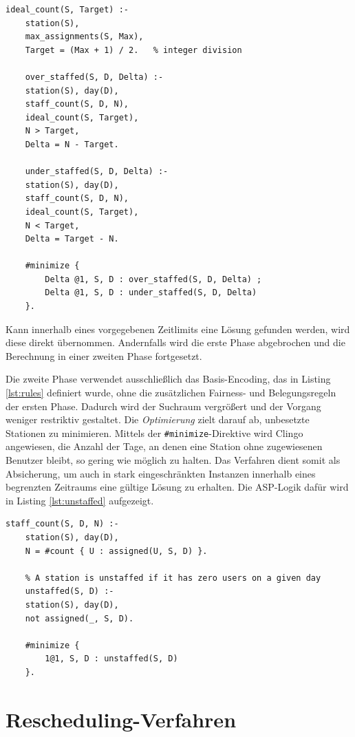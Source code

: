 \begin{lstlisting}[caption={Fairness-Regeln},label={lst:fairness}]
	ideal_count(S, Target) :-
	station(S),
	max_assignments(S, Max),
	Target = (Max + 1) / 2.   % integer division
	
	over_staffed(S, D, Delta) :-
	station(S), day(D),
	staff_count(S, D, N),
	ideal_count(S, Target),
	N > Target,
	Delta = N - Target.
	
	under_staffed(S, D, Delta) :-
	station(S), day(D),
	staff_count(S, D, N),
	ideal_count(S, Target),
	N < Target,
	Delta = Target - N.
	
	#minimize {
		Delta @1, S, D : over_staffed(S, D, Delta) ;
		Delta @1, S, D : under_staffed(S, D, Delta)
	}.
\end{lstlisting}

 

Kann innerhalb eines vorgegebenen Zeitlimits eine Lösung gefunden werden, wird diese direkt übernommen. Andernfalls wird die erste Phase abgebrochen und die Berechnung in einer zweiten Phase fortgesetzt.

Die zweite Phase verwendet ausschließlich das Basis-Encoding, das in Listing \ref{lst:rules} definiert wurde, ohne die zusätzlichen Fairness- und Belegungsregeln der ersten Phase. Dadurch wird der Suchraum vergrößert und der Vorgang weniger restriktiv gestaltet. Die \textit{Optimierung} zielt darauf ab, unbesetzte Stationen zu minimieren. Mittels der \texttt{\#minimize}-Direktive wird Clingo angewiesen, die Anzahl der Tage, an denen eine Station ohne zugewiesenen Benutzer bleibt, so gering wie möglich zu halten. Das Verfahren dient somit als Absicherung, um auch in stark eingeschränkten Instanzen innerhalb eines begrenzten Zeitraums eine gültige Lösung zu erhalten. Die ASP-Logik dafür wird in Listing \ref{lst:unstaffed} aufgezeigt.

\begin{lstlisting}[caption={ASP-Encoding: Leere Stationen vermeiden},label={lst:unstaffed}]
	staff_count(S, D, N) :-
	station(S), day(D),
	N = #count { U : assigned(U, S, D) }.
	
	% A station is unstaffed if it has zero users on a given day
	unstaffed(S, D) :-
	station(S), day(D),
	not assigned(_, S, D).
	
	#minimize {
		1@1, S, D : unstaffed(S, D)
	}.
\end{lstlisting}

\section{Rescheduling-Verfahren}\label{sec:rescheduling}

